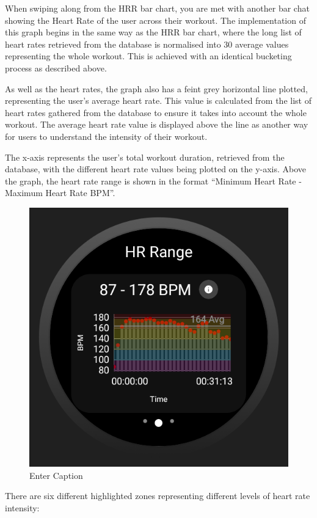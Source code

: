 \documentclass{l4proj}
\begin{document}
When swiping along from the HRR bar chart, you are met with another bar chat showing the Heart Rate of the user across their workout. The implementation of this graph begins in the same way as the HRR bar chart, where the long list of heart rates retrieved from the database is normalised into 30 average values representing the whole workout. This is achieved with an identical bucketing process as described above.

As well as the heart rates, the graph also has a feint grey horizontal line plotted, representing the user’s average heart rate. This value is calculated from the list of heart rates gathered from the database to ensure it takes into account the whole workout. The average heart rate value is displayed above the line as another way for users to understand the intensity of their workout.

The x-axis represents the user’s total workout duration, retrieved from the database, with the different heart rate values being plotted on the y-axis. Above the graph, the heart rate range is shown in the format “{Minimum Heart Rate} - {Maximum Heart Rate} BPM”.

\begin{figure}[h!]
    \centering
    \includegraphics[width=0.5\linewidth]{dissertation//dissImages/HRRangeGraph.png}
    \caption{Enter Caption}
    \label{fig:enter-label}
\end{figure}

There are six different highlighted zones representing different levels of heart rate intensity:
\end{document}
